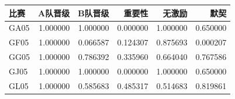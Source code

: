 \begin{tabular}{lrrrrr}
\toprule
比赛 & A队晋级 & B队晋级 & 重要性 & 无激励 & 默契 \\
\midrule
GA05 & 1.000000 & 1.000000 & 0.000000 & 1.000000 & 0.650000 \\
GF05 & 1.000000 & 0.066587 & 0.124307 & 0.875693 & 0.000207 \\
GG05 & 1.000000 & 0.786392 & 0.335960 & 0.664040 & 0.767586 \\
GJ05 & 1.000000 & 1.000000 & 0.000000 & 1.000000 & 0.650000 \\
GL05 & 1.000000 & 0.585683 & 0.485317 & 0.514683 & 0.819861 \\
\bottomrule
\end{tabular}

